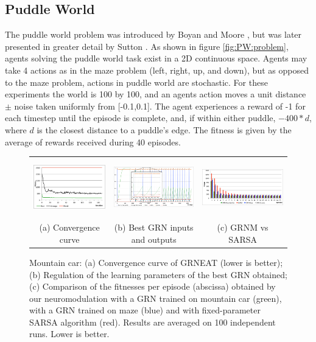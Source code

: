 
\subsection{Puddle World}

The puddle world problem was introduced by Boyan and Moore \cite{Boyan1995}, but was later presented in greater detail by Sutton \cite{sutton1996generalization}. As shown in figure \ref{fig:PW:problem}, agents solving the puddle world task exist in a 2D continuous space. Agents may take 4 actions as in the maze problem (left, right, up, and down), but as opposed to the maze problem, actions in puddle world are stochastic. For these experiments the world is 100 by 100, and an agents action moves a unit distance $\pm$ noise taken uniformly from [-0.1,0.1]. The agent experiences a reward of -1 for each timestep until the episode is complete, and, if within either puddle, $-400*d$, where $d$ is the closest distance to a puddle's edge. The fitness is given by the average of rewards received during 40 episodes.


\begin{figure}[t!]
\center
\begin{tabular}{ccc}
\includegraphics[height=2.5cm]{MC_convergence.pdf} &
\includegraphics[height=2.5cm]{MC_GRNBehavior.pdf} &
\includegraphics[height=2.5cm]{MC_GRNvsSARSA.pdf}\\
(a) Convergence curve &
(b) Best GRN inputs and outputs &
(c) GRNM vs SARSA
\end{tabular}
\caption{Mountain car: (a) Convergence curve of GRNEAT (lower is better); (b) Regulation of the learning parameters of the best GRN obtained; (c) Comparison of the fitnesses per episode (abscissa) obtained by our neuromodulation with a GRN trained on mountain car (green), with a GRN trained on maze (blue) and with fixed-parameter SARSA algorithm (red). Results are averaged on 100 independent runs. Lower is better.}\label{fig:MC:Results}
\end{figure}

